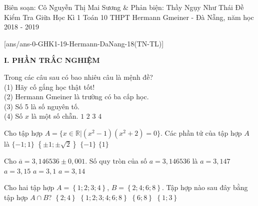 \begin{name}
{Biên soạn: Cô Nguyễn Thị Mai Sương \& Phản biện: Thầy Ngụy Như Thái}
{Đề Kiểm Tra Giữa Học Kì 1 Toán 10 THPT Hermann Gmeiner - Đà Nẵng, năm học 2018 - 2019}
\end{name}

\setcounter{ex}{0}\setcounter{bt}{0}
[ans/ans-0-GHK1-19-Hermann-DaNang-18(TN-TL)]

\noindent\textbf{I. PHẦN TRẮC NGHIỆM}
\begin{ex}%
Trong các câu sau có bao nhiêu câu là mệnh đề?\\
(1) Hãy cố gắng học thật tốt!\\
(2) Hermann Gmeiner là trường có ba cấp học.\\
(3) Số 5 là số nguyên tố.\\
(4) Số $x$ là một số chẵn.
\choice
{$1$}
{\True $2$}
{$3$}
{$4$}
\end{ex}
 

\begin{ex}%
Cho tập hợp $A=\{ x\in\mathbb{R}|( x^2-1)(x^2+2)=0\}$. Các phần tử của tập hợp $A$ là
\choice
{\True $\{-1;1\}$}
{$\left \{\pm 1;\pm\sqrt{2}\right \}$}
{$\{-1\}$}
{$\{1\}$}
\end{ex}

\begin{ex}%
Cho $\overline{a}=3{,}146536 \pm 0{,}001$. Số quy tròn của số $a=3{,}146536$ là
\choice
{$a=3{,}147$}
{\True $a=3{,}15$}
{$a=3{,}1$}
{$a=3{,}14$}
\end{ex}
\begin{ex}%
Cho hai tập hợp $A=\left\{1;2;3;4\right\}$, $B=\left\{ 2;4;6;8 \right\}$. Tập hợp nào sau đây bằng tập hợp $A\cap B$?
\choice
{\True$\left \{ 2;4  \right \}$}
{$\left \{1;2;3;4;6;8  \right \}$}
{$\left \{6;8  \right \}$}
{$\left \{1;3  \right \}$}
\end{ex}

